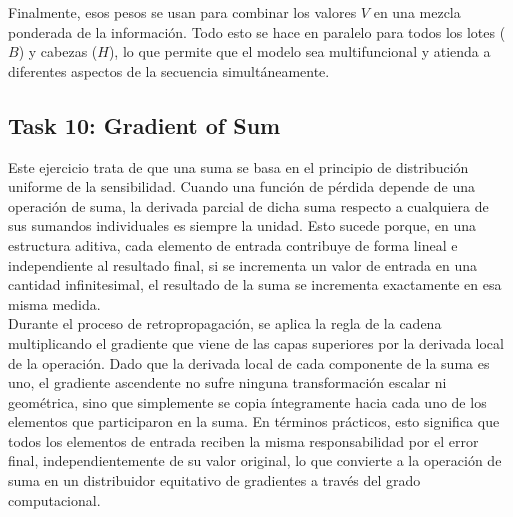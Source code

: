 ﻿\documentclass[12pt]{article}
\begin{document}
Finalmente, esos pesos se usan para combinar los valores $V$ en una mezcla ponderada de la información. Todo esto se hace en paralelo para todos los lotes ($B$) y cabezas ($H$), lo que permite que el modelo sea multifuncional y atienda a diferentes aspectos de la secuencia simultáneamente.



\subsection*{Task 10: Gradient of Sum}
Este ejercicio trata de que una suma se basa en el principio de 
distribución uniforme de la sensibilidad. Cuando una
función de pérdida depende de una operación de suma, la derivada parcial de dicha 
suma respecto a cualquiera de sus sumandos individuales es siempre la unidad. 
Esto sucede porque, en una estructura aditiva, cada elemento de entrada
contribuye de forma lineal e independiente al resultado final, si 
se incrementa un valor de entrada en una cantidad infinitesimal, el resultado de la suma
se incrementa exactamente en esa misma medida. \\
Durante el proceso de retropropagación, se aplica la regla de la cadena multiplicando 
el gradiente que viene de las capas superiores por la derivada local de la operación. 
Dado que la derivada local de cada componente de la suma es uno, el gradiente ascendente
no sufre ninguna transformación escalar ni geométrica, sino que simplemente se copia 
íntegramente hacia cada uno de los elementos que participaron en la suma. En términos prácticos, 
esto significa que todos los elementos de entrada reciben la misma responsabilidad por el error
final, independientemente de su valor original, lo que convierte a la operación de suma en un 
distribuidor equitativo de gradientes a través del grado computacional.
\end{document}
